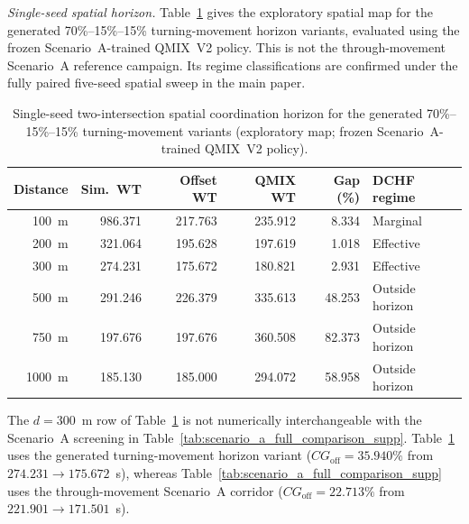 \documentclass[12pt]{article}
\begin{document}
\textit{Single-seed spatial horizon.} Table~\ref{tab:supp_spatial} gives the
exploratory spatial map for the generated 70\%--15\%--15\%
turning-movement horizon variants, evaluated using the frozen
Scenario~A-trained QMIX~V2 policy. This is not the through-movement
Scenario~A reference campaign. Its regime classifications are confirmed
under the fully paired five-seed spatial sweep in the main paper.
\begin{table}[H]
\centering
\caption{Single-seed two-intersection spatial coordination horizon for the
generated 70\%--15\%--15\% turning-movement variants
(exploratory map; frozen Scenario~A-trained QMIX~V2 policy).}
\label{tab:supp_spatial}
\small
\begin{tabular}{rrrrrl}
\toprule
\textbf{Distance} & \textbf{Sim.\ WT} & \textbf{Offset WT} & \textbf{QMIX WT} &
\textbf{Gap (\%)} & \textbf{DCHF regime} \\
\midrule
100~m  & 986.371 & 217.763 & 235.912 &  8.334 & Marginal        \\
200~m  & 321.064 & 195.628 & 197.619 &  1.018 & Effective       \\
300~m  & 274.231 & 175.672 & 180.821 &  2.931 & Effective       \\
500~m  & 291.246 & 226.379 & 335.613 & 48.253 & Outside horizon \\
750~m  & 197.676 & 197.676 & 360.508 & 82.373 & Outside horizon \\
1000~m & 185.130 & 185.000 & 294.072 & 58.958 & Outside horizon \\
\bottomrule
\end{tabular}
\end{table}
The $d=300$~m row of Table~\ref{tab:supp_spatial} is not numerically
interchangeable with the Scenario~A screening in
Table~\ref{tab:scenario_a_full_comparison_supp}. Table~\ref{tab:supp_spatial}
uses the generated turning-movement horizon variant
($CG_{\mathrm{off}}=35.940\%$ from $274.231\rightarrow175.672$~s),
whereas Table~\ref{tab:scenario_a_full_comparison_supp} uses the
through-movement Scenario~A corridor
($CG_{\mathrm{off}}=22.713\%$ from $221.901\rightarrow171.501$~s).
\end{document}
